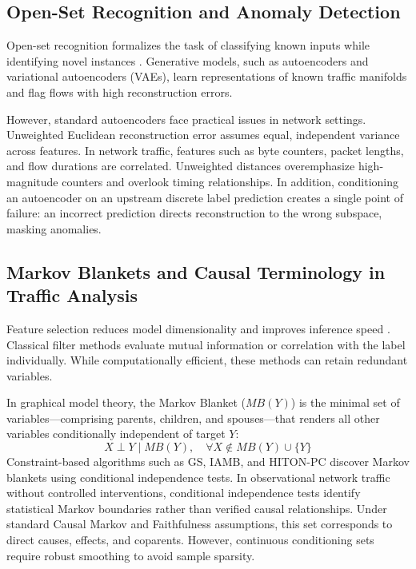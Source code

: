\documentclass[10pt,journal,compsoc]{IEEEtran}
\begin{document}
\subsection{Open-Set Recognition and Anomaly Detection}
Open-set recognition formalizes the task of classifying known inputs while identifying novel instances \cite{geng2020, scheirer2013}. Generative models, such as autoencoders and variational autoencoders (VAEs), learn representations of known traffic manifolds and flag flows with high reconstruction errors.

However, standard autoencoders face practical issues in network settings. Unweighted Euclidean reconstruction error assumes equal, independent variance across features. In network traffic, features such as byte counters, packet lengths, and flow durations are correlated. Unweighted distances overemphasize high-magnitude counters and overlook timing relationships. In addition, conditioning an autoencoder on an upstream discrete label prediction creates a single point of failure: an incorrect prediction directs reconstruction to the wrong subspace, masking anomalies.

\subsection{Markov Blankets and Causal Terminology in Traffic Analysis}
Feature selection reduces model dimensionality and improves inference speed \cite{aljawarneh2018}. Classical filter methods evaluate mutual information or correlation with the label individually. While computationally efficient, these methods can retain redundant variables.

In graphical model theory, the Markov Blanket ($MB(Y)$) is the minimal set of variables—comprising parents, children, and spouses—that renders all other variables conditionally independent of target $Y$:
\begin{equation}
X \perp Y \mid MB(Y), \quad \forall X \notin MB(Y) \cup \{Y\}
\end{equation}
Constraint-based algorithms such as GS, IAMB, and HITON-PC discover Markov blankets using conditional independence tests. In observational network traffic without controlled interventions, conditional independence tests identify statistical Markov boundaries rather than verified causal relationships. Under standard Causal Markov and Faithfulness assumptions, this set corresponds to direct causes, effects, and coparents. However, continuous conditioning sets require robust smoothing to avoid sample sparsity.
\end{document}
